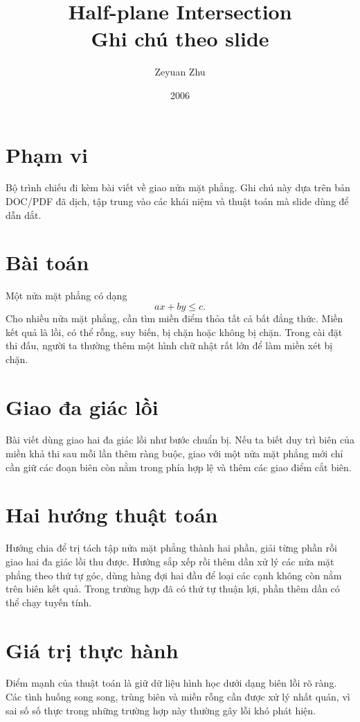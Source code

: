 \documentclass[11pt]{article}
\title{Half-plane Intersection\\{\large Ghi chú theo slide}}
\author{Zeyuan Zhu}
\date{2006}
\begin{document}
\maketitle


\section{Phạm vi}

Bộ trình chiếu đi kèm bài viết về giao nửa mặt phẳng. Ghi chú này dựa trên
bản DOC/PDF đã dịch, tập trung vào các khái niệm và thuật toán mà slide dùng
để dẫn dắt.

\section{Bài toán}

Một nửa mặt phẳng có dạng
\[
  ax+by\le c.
\]
Cho nhiều nửa mặt phẳng, cần tìm miền điểm thỏa tất cả bất đẳng thức. Miền
kết quả là lồi, có thể rỗng, suy biến, bị chặn hoặc không bị chặn. Trong cài
đặt thi đấu, người ta thường thêm một hình chữ nhật rất lớn để làm miền xét
bị chặn.

\section{Giao đa giác lồi}

Bài viết dùng giao hai đa giác lồi như bước chuẩn bị. Nếu ta biết duy trì
biên của miền khả thi sau mỗi lần thêm ràng buộc, giao với một nửa mặt phẳng
mới chỉ cần giữ các đoạn biên còn nằm trong phía hợp lệ và thêm các giao điểm
cắt biên.

\section{Hai hướng thuật toán}

Hướng chia để trị tách tập nửa mặt phẳng thành hai phần, giải từng phần rồi
giao hai đa giác lồi thu được. Hướng sắp xếp rồi thêm dần xử lý các nửa mặt
phẳng theo thứ tự góc, dùng hàng đợi hai đầu để loại các cạnh không còn nằm
trên biên kết quả. Trong trường hợp đã có thứ tự thuận lợi, phần thêm dần có
thể chạy tuyến tính.

\section{Giá trị thực hành}

Điểm mạnh của thuật toán là giữ dữ liệu hình học dưới dạng biên lồi rõ ràng.
Các tình huống song song, trùng biên và miền rỗng cần được xử lý nhất quán,
vì sai số số thực trong những trường hợp này thường gây lỗi khó phát hiện.
\end{document}
